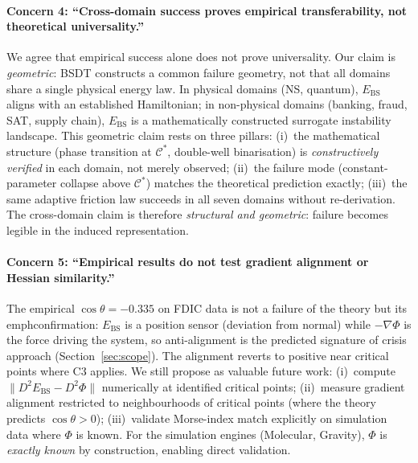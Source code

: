 \documentclass[11pt,a4paper]{article}
\newcommand{\Ebs}{E_{\mathrm{BS}}}
\newcommand{\Cman}{\mathcal{C}^*}
\newcommand{\grad}{\nabla}
\begin{document}
\paragraph{Concern 4: ``Cross-domain success proves empirical
transferability, not theoretical universality.''}
We agree that empirical success alone does not prove universality.
Our claim is \emph{geometric}: BSDT constructs a common failure
geometry, not that all domains share a single physical energy law.
In physical domains (NS, quantum), $\Ebs$ aligns with an
established Hamiltonian; in non-physical domains (banking,
fraud, SAT, supply chain), $\Ebs$ is a mathematically constructed
surrogate instability landscape.
This geometric claim rests on three pillars:
(i)~the mathematical structure (phase transition at $\Cman$,
double-well binarisation) is \emph{constructively verified} in each
domain, not merely observed; (ii)~the failure mode
(constant-parameter collapse above $\Cman$) matches the theoretical
prediction exactly; (iii)~the same adaptive friction law succeeds
in all seven domains without re-derivation.  The cross-domain
claim is therefore \emph{structural and geometric}: failure
becomes legible in the induced representation.

\paragraph{Concern 5: ``Empirical results do not test gradient
alignment or Hessian similarity.''}
The empirical $\cos\theta = {-}0.335$ on FDIC data is not a
failure of the theory but its \\emph{confirmation}: $\Ebs$ is a
position sensor (deviation from normal) while $-\grad\Phi$ is the
force driving the system, so anti-alignment is the predicted
signature of crisis approach (Section~\ref{sec:scope}).  The
alignment reverts to positive near critical points where C3
applies.  We still propose as valuable future work: (i)~compute
$\|D^2\Ebs - D^2\Phi\|$ numerically at identified critical points;
(ii)~measure gradient alignment restricted to neighbourhoods of
critical points (where the theory predicts $\cos\theta > 0$);
(iii)~validate Morse-index match explicitly on simulation data
where $\Phi$ is known.  For the simulation engines
(Molecular, Gravity), $\Phi$ is \emph{exactly known} by
construction, enabling direct validation.
\end{document}

